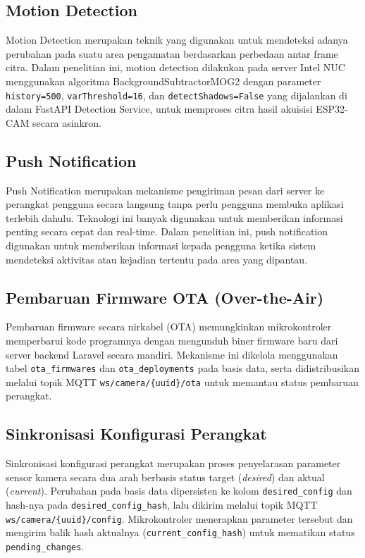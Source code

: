 \subsection{Motion Detection}

Motion Detection merupakan teknik yang digunakan untuk mendeteksi adanya perubahan pada suatu area pengamatan berdasarkan perbedaan antar frame citra. Dalam penelitian ini, motion detection dilakukan pada server Intel NUC menggunakan algoritma BackgroundSubtractorMOG2 dengan parameter \texttt{history=500}, \texttt{varThreshold=16}, dan \texttt{detectShadows=False} yang dijalankan di dalam FastAPI Detection Service, untuk memproses citra hasil akuisisi ESP32-CAM secara asinkron.

\subsection{Push Notification}

Push Notification merupakan mekanisme pengiriman pesan dari server ke perangkat pengguna secara langsung tanpa perlu pengguna membuka aplikasi terlebih dahulu. Teknologi ini banyak digunakan untuk memberikan informasi penting secara cepat dan real-time. Dalam penelitian ini, push notification digunakan untuk memberikan informasi kepada pengguna ketika sistem mendeteksi aktivitas atau kejadian tertentu pada area yang dipantau.

\subsection{Pembaruan Firmware OTA (Over-the-Air)}

Pembaruan firmware secara nirkabel (OTA) memungkinkan mikrokontroler memperbarui kode programnya dengan mengunduh biner firmware baru dari server backend Laravel secara mandiri. Mekanisme ini dikelola menggunakan tabel \texttt{ota\_firmwares} dan \texttt{ota\_deployments} pada basis data, serta didistribusikan melalui topik MQTT \texttt{ws/camera/\{uuid\}/ota} untuk memantau status pembaruan perangkat.

\subsection{Sinkronisasi Konfigurasi Perangkat}

Sinkronisasi konfigurasi perangkat merupakan proses penyelarasan parameter sensor kamera secara dua arah berbasis status target (\textit{desired}) dan aktual (\textit{current}). Perubahan pada basis data dipersisten ke kolom \texttt{desired\_config} dan hash-nya pada \texttt{desired\_config\_hash}, lalu dikirim melalui topik MQTT \texttt{ws/camera/\{uuid\}/config}. Mikrokontroler menerapkan parameter tersebut dan mengirim balik hash aktualnya (\texttt{current\_config\_hash}) untuk mematikan status \texttt{pending\_changes}.

